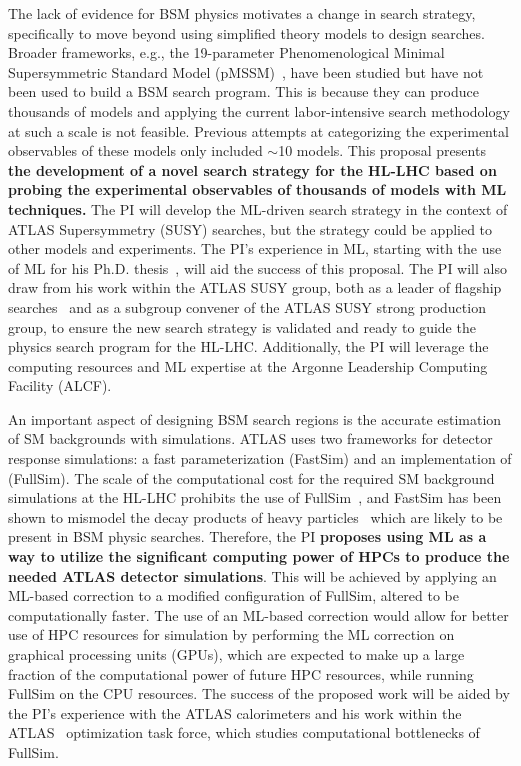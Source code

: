 \documentclass[letter, USenglish, 11pt, subfigure]{article}
\begin{document}
The lack of evidence for BSM physics motivates a change in search strategy, specifically to move beyond using simplified theory models to design searches. Broader frameworks, e.g., the 19-parameter Phenomenological 
Minimal Supersymmetric Standard Model (pMSSM)~\cite{Djouadi_2007,Berger:2008cq,Cahill_Rowley_2012}, have been studied but have not been used to build a BSM search program. This is because they can produce thousands of models and applying the current labor-intensive search methodology at such a scale is not feasible. Previous attempts at categorizing the experimental observables of these models only included $\sim$10 models. This proposal presents {\bf the development of a novel search strategy for the HL-LHC based on probing the experimental observables of thousands of models with ML techniques.} The PI will develop the ML-driven search strategy in the context of ATLAS Supersymmetry (SUSY)
searches, but the strategy could be applied to other models and experiments. The PI's experience in ML, starting with the use of ML for his Ph.D. thesis~\cite{Aaltonen:2011fi,Aaltonen:2013as},
will aid the success of this proposal. The PI will also draw from his work within the ATLAS SUSY group, both as a leader of flagship searches~\cite{stop0L_1,stopRun1,stop0L_2,stop0L_3} and as a subgroup convener of the ATLAS SUSY strong production group, to ensure the new search strategy is validated and ready to guide the physics search program for the HL-LHC. Additionally, the PI will leverage the computing resources and ML expertise at the Argonne Leadership Computing Facility (ALCF).

An important aspect of designing BSM search regions is the accurate estimation of SM backgrounds with simulations. ATLAS uses two frameworks for detector response simulations: a fast parameterization (FastSim) and an implementation of \GEANT (FullSim). The scale of the computational cost for the required SM background simulations at the HL-LHC prohibits the use of FullSim~\cite{computingCDR}, and FastSim has been shown to mismodel the decay products of heavy particles~\cite{hcw2018} which are likely to be present in BSM physic searches. Therefore, the PI {\bf proposes using ML as a way to utilize the significant computing power of HPCs to produce the needed ATLAS detector simulations}. This will be achieved by applying an ML-based correction to a modified configuration of FullSim, altered to be computationally faster. The use of an ML-based correction would allow for better use of HPC resources for simulation by performing the ML correction on graphical processing units (GPUs), which are expected to make up a large fraction of the computational power of future HPC resources, while running FullSim on the CPU resources. The success of the proposed work will be aided by the PI's experience with the ATLAS calorimeters and his work within the ATLAS \GEANT\ optimization task force, which studies computational bottlenecks of FullSim. 
\end{document}
